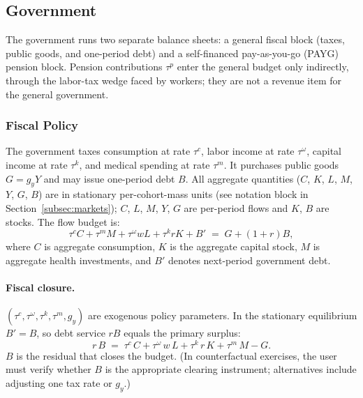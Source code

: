 \documentclass[12pt,a4paper]{article}
\begin{document}
\subsection{Government}
\label{subsec:government}

The government runs two separate balance sheets: a general fiscal block (taxes, public goods, and one-period debt) and a self-financed pay-as-you-go (PAYG) pension block. Pension contributions $\tau^p$ enter the general budget only indirectly, through the labor-tax wedge faced by workers; they are not a revenue item for the general government.

\subsubsection{Fiscal Policy}
\label{subsubsec:fiscal}
The government taxes consumption at rate $\tau^c$, labor income at rate $\tau^\omega$, capital income at rate $\tau^k$, and medical spending at rate $\tau^m$. It purchases public goods $G = g_y Y$ and may issue one-period debt $B$. All aggregate quantities ($C$, $K$, $L$, $M$, $Y$, $G$, $B$) are in stationary per-cohort-mass units (see notation block in Section~\ref{subsec:markets}); $C$, $L$, $M$, $Y$, $G$ are per-period flows and $K$, $B$ are stocks. The flow budget is:
\begin{equation}
\label{eq:gov_budget}
\tau^c C + \tau^m M + \tau^\omega w L + \tau^k r K + B' \;=\; G + (1+r)B,
\end{equation}
where $C$ is aggregate consumption, $K$ is the aggregate capital stock, $M$ is aggregate health investments, and $B'$ denotes next-period government debt.

\paragraph{Fiscal closure.}
$(\tau^c, \tau^\omega, \tau^k, \tau^m, g_y)$ are exogenous policy parameters. In the stationary equilibrium $B' = B$, so debt service $r B$ equals the primary surplus:
\begin{equation}
\label{eq:gov_stationary}
r\, B \;=\; \tau^c\, C + \tau^\omega\, w\, L + \tau^k\, r\, K + \tau^m\, M - G.
\end{equation}
$B$ is the residual that closes the budget. (In counterfactual exercises, the user must verify whether $B$ is the appropriate clearing instrument; alternatives include adjusting one tax rate or $g_y$.)
\end{document}
